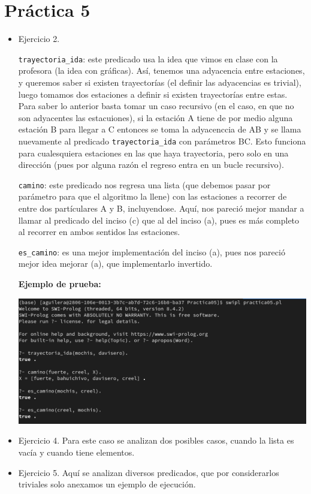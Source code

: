 \documentclass{article}
\newcommand{\code}[1]{\textcolor{white!25!black}{\texttt{#1}}}
\begin{document}
\section*{\LARGE{Práctica 5}}
\newcommand{\localtextbulletone}{\textcolor{black}{\raisebox{.45ex}{\rule{.6ex}{.6ex}}}}
\renewcommand{\labelitemi}{\localtextbulletone}
\begin{itemize}
\item Ejercicio 2.

  \code{trayectoria\_ida}: este predicado usa la idea que vimos en clase
  con la profesora (la idea con gráficas). Así, tenemos una adyacencia
  entre estaciones, y queremos saber si existen trayectorías (el definir
  las adyacencias es trivial), luego tomamos dos estaciones a definir si
  existen trayectorías entre estas. Para saber lo anterior basta tomar
  un caso recursivo (en el caso, en que no son adyacentes las estacuiones),
  si la estación A tiene de por medio alguna estación B para llegar a C
  entonces se toma la adyacenccia de AB y se llama nuevamente al predicado
  \code{trayectoria\_ida} con parámetros BC. Esto funciona para cualesquiera
  estaciones en las que haya trayectoria, pero solo  en una dirección (pues
  por alguna razón el regreso entra en un bucle recursivo).
  
  \code{camino}: este predicado nos regresa una lista (que debemos pasar
  por parámetro para que el algoritmo la llene) con las estaciones a
  recorrer de entre dos partículares A y B, incluyendose. Aquí, nos pareció
  mejor mandar a llamar al predicado del inciso (c) que al del inciso (a),
  pues es más completo al recorrer en ambos sentidos las estaciones.
  
  \code{es\_camino}: es una mejor implementación del inciso (a), pues
  nos pareció mejor idea mejorar (a), que implementarlo invertido.
  
  \textbf{Ejemplo de prueba:}
  \begin{center}
    \includegraphics[scale=0.30]{./CasoPruebaEjercicio2.png}\\[0.4cm]
  \end{center}
\item Ejercicio 4. Para este caso se analizan dos posibles casos,
  cuando la lista es vacía y cuando tiene elementos.
\item Ejercicio 5.
  Aquí se analizan diversos predicados, que por considerarlos triviales
  solo anexamos un ejemplo de ejecución.
  

\end{itemize}
\end{document}
